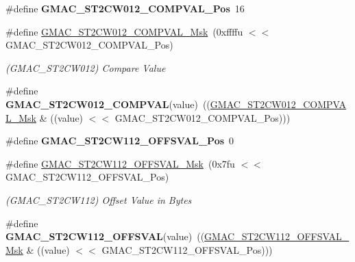 \begin{DoxyCompactItemize}
\item 
\mbox{\label{group__SAMV71__GMAC_ga7a41278dd4751d8f47f93398a1bb028c}} 
\#define {\bfseries G\+M\+A\+C\+\_\+\+S\+T2\+C\+W012\+\_\+\+C\+O\+M\+P\+V\+A\+L\+\_\+\+Pos}~16
\item 
\mbox{\label{group__SAMV71__GMAC_ga1423baba169c67aa4e56a5af8b37c930}} 
\#define \mbox{\hyperlink{group__SAMV71__GMAC_ga1423baba169c67aa4e56a5af8b37c930}{G\+M\+A\+C\+\_\+\+S\+T2\+C\+W012\+\_\+\+C\+O\+M\+P\+V\+A\+L\+\_\+\+Msk}}~(0xffffu $<$$<$ G\+M\+A\+C\+\_\+\+S\+T2\+C\+W012\+\_\+\+C\+O\+M\+P\+V\+A\+L\+\_\+\+Pos)
\begin{DoxyCompactList}\small\item\em (G\+M\+A\+C\+\_\+\+S\+T2\+C\+W012) Compare Value \end{DoxyCompactList}\item 
\mbox{\label{group__SAMV71__GMAC_gacf369867ba31e5267dd42dc22e065b3d}} 
\#define {\bfseries G\+M\+A\+C\+\_\+\+S\+T2\+C\+W012\+\_\+\+C\+O\+M\+P\+V\+AL}(value)~((\mbox{\hyperlink{group__SAMV71__GMAC_ga1423baba169c67aa4e56a5af8b37c930}{G\+M\+A\+C\+\_\+\+S\+T2\+C\+W012\+\_\+\+C\+O\+M\+P\+V\+A\+L\+\_\+\+Msk}} \& ((value) $<$$<$ G\+M\+A\+C\+\_\+\+S\+T2\+C\+W012\+\_\+\+C\+O\+M\+P\+V\+A\+L\+\_\+\+Pos)))
\item 
\mbox{\label{group__SAMV71__GMAC_gab32103b25739c6113e8076d7723e0db9}} 
\#define {\bfseries G\+M\+A\+C\+\_\+\+S\+T2\+C\+W112\+\_\+\+O\+F\+F\+S\+V\+A\+L\+\_\+\+Pos}~0
\item 
\mbox{\label{group__SAMV71__GMAC_gad3513359ab4b674dff11d2b90e5683cf}} 
\#define \mbox{\hyperlink{group__SAMV71__GMAC_gad3513359ab4b674dff11d2b90e5683cf}{G\+M\+A\+C\+\_\+\+S\+T2\+C\+W112\+\_\+\+O\+F\+F\+S\+V\+A\+L\+\_\+\+Msk}}~(0x7fu $<$$<$ G\+M\+A\+C\+\_\+\+S\+T2\+C\+W112\+\_\+\+O\+F\+F\+S\+V\+A\+L\+\_\+\+Pos)
\begin{DoxyCompactList}\small\item\em (G\+M\+A\+C\+\_\+\+S\+T2\+C\+W112) Offset Value in Bytes \end{DoxyCompactList}\item 
\mbox{\label{group__SAMV71__GMAC_ga77281bb6ee2dd0b756cb3f06b80d7e55}} 
\#define {\bfseries G\+M\+A\+C\+\_\+\+S\+T2\+C\+W112\+\_\+\+O\+F\+F\+S\+V\+AL}(value)~((\mbox{\hyperlink{group__SAMV71__GMAC_gad3513359ab4b674dff11d2b90e5683cf}{G\+M\+A\+C\+\_\+\+S\+T2\+C\+W112\+\_\+\+O\+F\+F\+S\+V\+A\+L\+\_\+\+Msk}} \& ((value) $<$$<$ G\+M\+A\+C\+\_\+\+S\+T2\+C\+W112\+\_\+\+O\+F\+F\+S\+V\+A\+L\+\_\+\+Pos)))

\end{DoxyCompactItemize}
